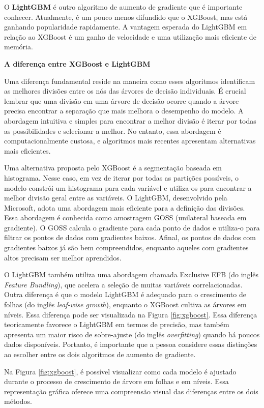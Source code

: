 O \textbf{LightGBM} é outro algoritmo de aumento de gradiente que é importante conhecer. Atualmente, é um pouco menos difundido que o XGBoost, mas está ganhando popularidade rapidamente. A vantagem esperada do LightGBM em relação ao XGBoost é um ganho de velocidade e uma utilização mais eficiente de memória.


\noindent\textbf{A diferen\c ca entre XGBoost e LightGBM}

Uma diferença fundamental reside na maneira como esses algoritmos identificam as melhores divisões entre os nós das árvores de decisão individuais. É crucial lembrar que uma divisão em uma árvore de decisão ocorre quando a árvore precisa encontrar a separação que mais melhora o desempenho do modelo.
A abordagem intuitiva e simples para encontrar a melhor divisão é iterar por todas as possibilidades e selecionar a melhor. No entanto, essa abordagem é computacionalmente custosa, e algoritmos mais recentes apresentam alternativas mais eficientes.

Uma alternativa proposta pelo XGBoost é a segmentação baseada em histograma. Nesse caso, em vez de iterar por todas as partições possíveis, o modelo constrói um histograma para cada variável e utiliza-os para encontrar a melhor divisão geral entre as variáveis.
O LightGBM, desenvolvido pela Microsoft, adota uma abordagem mais eficiente para a definição das divisões. Essa abordagem é conhecida como amostragem GOSS (unilateral baseada em gradiente). O GOSS calcula o gradiente para cada ponto de dados e utiliza-o para filtrar os pontos de dados com gradientes baixos. Afinal, os pontos de dados com gradientes baixos já são bem compreendidos, enquanto aqueles com gradientes altos precisam ser melhor aprendidos.

O LightGBM também utiliza uma abordagem chamada Exclusive EFB (do inglês \textit{Feature Bundling}), que acelera a seleção de muitas variáveis correlacionadas. Outra diferença é que o modelo LightGBM é adequado para o crescimento de folhas (do inglês \textit{leaf-wise growth}), enquanto o XGBoost cultiva as árvores em níveis. Essa diferença pode ser visualizada na Figura \ref{fig:xgboost}.
Essa diferença teoricamente favorece o LightGBM em termos de precisão, mas também apresenta um maior risco de sobre-ajuste (do inglês \textit{overfitting}) quando há poucos dados disponíveis. Portanto, é importante que a pessoa considere essas distinções ao escolher entre os dois algoritmos de aumento de gradiente.

Na Figura \ref{fig:xgboost}, é possível visualizar como cada modelo é ajustado durante o processo de crescimento de árvore em folhas e em níveis. Essa representação gráfica oferece uma compreensão visual das diferenças entre os dois métodos.

